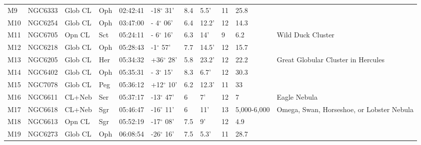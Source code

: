 \begin{longtable}{@{}lllllllllll@{}}
M9         & NGC6333     & Glob CL    & Oph       & 02:42:41 & -18$^{\circ}$ 31'  & 8.4       & 5.5'                 & 11       & 25.8                &                                           \\
M10        & NGC6254     & Glob CL    & Oph       & 03:47:00 & - 4$^{\circ}$ 06'  & 6.4       & 12.2'                & 12       & 14.3                &                                           \\
M11        & NGC6705     & Opn CL     & Sct       & 05:24:11 & - 6$^{\circ}$ 16'  & 6.3       & 14'                  & 9        & 6.2                 & Wild Duck Cluster                         \\
M12        & NGC6218     & Glob CL    & Oph       & 05:28:43 & -1$^{\circ}$ 57'   & 7.7       & 14.5'                & 12       & 15.7                &                                           \\
M13        & NGC6205     & Glob CL    & Her       & 05:34:32 & +36$^{\circ}$ 28'  & 5.8       & 23.2'                & 12       & 22.2                & Great Globular Cluster in Hercules        \\
M14        & NGC6402     & Glob CL    & Oph       & 05:35:31 & - 3$^{\circ}$ 15'  & 8.3       & 6.7'                 & 12       & 30.3                &                                           \\
M15        & NGC7078     & Glob CL    & Peg       & 05:36:12 & +12$^{\circ}$ 10'  & 6.2       & 12.3'                & 11       & 33                  &                                           \\
M16        & NGC6611     & CL+Neb     & Ser       & 05:37:17 & -13$^{\circ}$ 47'  & 6         & 7'                   & 12       & 7                   & Eagle Nebula                              \\
M17        & NGC6618     & CL+Neb     & Sgr       & 05:46:47 & -16$^{\circ}$ 11'  & 6         & 11'                  & 13       & 5,000-6,000         & Omega, Swan, Horseshoe, or Lobster Nebula \\
M18        & NGC6613     & Opn CL     & Sgr       & 05:52:19 & -17$^{\circ}$ 08'  & 7.5       & 9'                   & 12       & 4.9                 &                                           \\
M19        & NGC6273     & Glob CL    & Oph       & 06:08:54 & -26$^{\circ}$ 16'  & 7.5       & 5.3'                 & 11       & 28.7                &                                           \\

\end{longtable}
